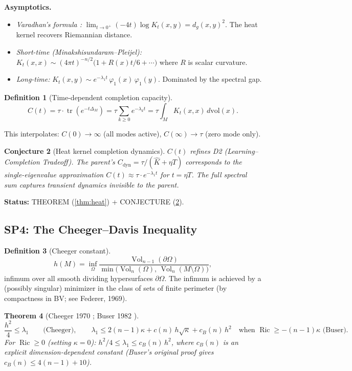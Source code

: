 \documentclass[11pt]{article}
\newtheorem{theorem}{Theorem}[section]
\newtheorem{conjecture}[theorem]{Conjecture}
\theoremstyle{definition}
\newtheorem{definition}[theorem]{Definition}
\theoremstyle{remark}
\newcommand{\Ric}{\operatorname{Ric}}
\newcommand{\Vol}{\operatorname{Vol}}
\newcommand{\dvol}{\,d\mathrm{vol}}
\begin{document}
\textbf{Asymptotics.}
\begin{itemize}[nosep]
\item \emph{Varadhan's formula \cite{Varadhan}:} $\lim_{t \to 0^+}(-4t)\log K_t(x,y) = d_g(x,y)^2$. The heat kernel recovers Riemannian distance.
\item \emph{Short-time (Minakshisundaram--Pleijel):} $K_t(x,x) \sim (4\pi t)^{-n/2}\bigl(1 + R(x)t/6 + \cdots\bigr)$ where $R$ is scalar curvature.
\item \emph{Long-time:} $K_t(x,y) \sim e^{-\lambda_1 t}\,\varphi_1(x)\,\varphi_1(y)$. Dominated by the spectral gap.
\end{itemize}

\begin{definition}[Time-dependent completion capacity]
\[
C(t) = \tau \cdot \operatorname{tr}(e^{-t\Delta_M}) = \tau \sum_{k \ge 0} e^{-\lambda_k t} = \tau \int_M K_t(x,x)\dvol(x).
\]
\end{definition}

This interpolates: $C(0) \to \infty$ (all modes active), $C(\infty) \to \tau$ (zero mode only).

\begin{conjecture}[Heat kernel completion dynamics]\label{conj:heatdyn}
$C(t)$ refines D2 (Learning--Completion Tradeoff). The parent's $C_{\mathrm{dyn}} = \tau/(\hat{K} + \eta T)$ corresponds to the single-eigenvalue approximation $C(t) \approx \tau \cdot e^{-\lambda_1 t}$ for $t = \eta T$. The full spectral sum captures transient dynamics invisible to the parent.
\end{conjecture}

\textbf{Status:} THEOREM (\ref{thm:heat}) + CONJECTURE (\ref{conj:heatdyn}).


\subsection{SP4: The Cheeger--Davis Inequality}

\begin{definition}[Cheeger constant]\label{def:cheeger}
\[
h(M) = \inf_\Omega \frac{\Vol_{n-1}(\partial\Omega)}{\min\bigl(\Vol_n(\Omega),\, \Vol_n(M \setminus \Omega)\bigr)},
\]
infimum over all smooth dividing hypersurfaces $\partial\Omega$. The infimum is achieved by a (possibly singular) minimizer in the class of sets of finite perimeter (by compactness in BV; see Federer, 1969).
\end{definition}

\begin{theorem}[Cheeger 1970 {\cite{Cheeger}}; Buser 1982 {\cite{Buser}}]\label{thm:cheeger}
\[
\frac{h^2}{4} \le \lambda_1 \qquad\text{(Cheeger)}, \qquad
\lambda_1 \le 2(n-1)\kappa + c(n)\,h\sqrt{\kappa} + c_B(n)\,h^2 \quad\text{when } \Ric \ge -(n-1)\kappa \text{ (Buser)}.
\]
For $\Ric \ge 0$ (setting $\kappa = 0$): $h^2/4 \le \lambda_1 \le c_B(n)\,h^2$, where $c_B(n)$ is an explicit dimension-dependent constant (Buser's original proof gives $c_B(n) \le 4(n-1) + 10$).
\end{theorem}
\end{document}
